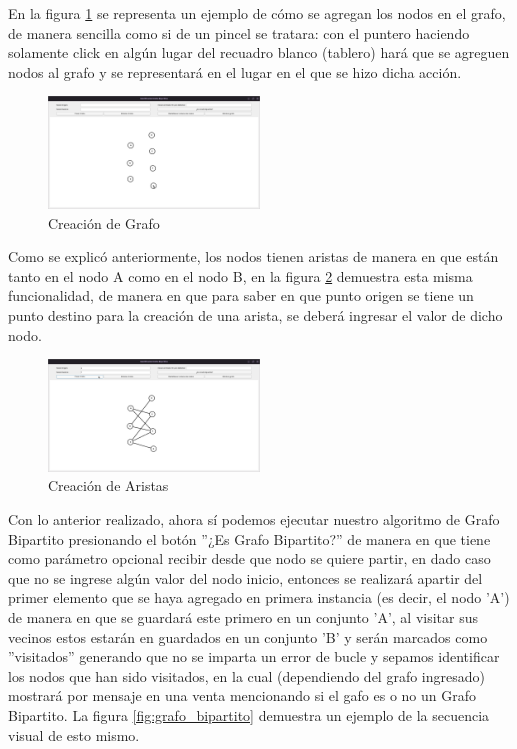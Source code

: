 \documentclass[conference]{IEEEtran}
\begin{document}
En la figura \ref{fig:creacion_grafo} se representa un ejemplo de cómo se agregan los nodos en el grafo, de manera sencilla como si de un pincel se tratara: con el puntero haciendo solamente click en algún lugar del recuadro blanco (tablero) hará que se agreguen nodos al grafo y se representará en el lugar en el que se hizo dicha acción.

\begin{figure}[htbp]
    \includegraphics[width=0.5\textwidth]{images/creacion_grafo.png} 
    \caption{Creación de Grafo}
    \label{fig:creacion_grafo}
\end{figure}

Como se explicó anteriormente, los nodos tienen aristas de manera en que están tanto en el nodo A como en el nodo B, en la figura \ref{fig:creacion_aristas} demuestra esta misma funcionalidad, de manera en que para saber en que punto origen se tiene un punto destino para la creación de una arista, se deberá ingresar el valor de dicho nodo.

\begin{figure}[htbp]
    \includegraphics[width=0.5\textwidth]{images/creacion_arista.png} 
    \caption{Creación de Aristas}
    \label{fig:creacion_aristas}
\end{figure}

Con lo anterior realizado, ahora sí podemos ejecutar nuestro algoritmo de Grafo Bipartito presionando el botón ''¿Es Grafo Bipartito?'' de manera en que tiene como parámetro opcional recibir desde que nodo se quiere partir, en dado caso que no se ingrese algún valor del nodo inicio, entonces se realizará apartir del primer elemento que se haya agregado en primera instancia (es decir, el nodo 'A') de manera en que se guardará este primero en un conjunto 'A', al visitar sus vecinos estos estarán en guardados en un conjunto 'B' y serán marcados como ''visitados'' generando que no se imparta un error de bucle y sepamos identificar los nodos que han sido visitados, en la cual (dependiendo del grafo ingresado) mostrará por mensaje en una venta mencionando si el gafo es o no un Grafo Bipartito. La figura \ref{fig:grafo_bipartito} demuestra un ejemplo de la secuencia visual de esto mismo.
\end{document}
